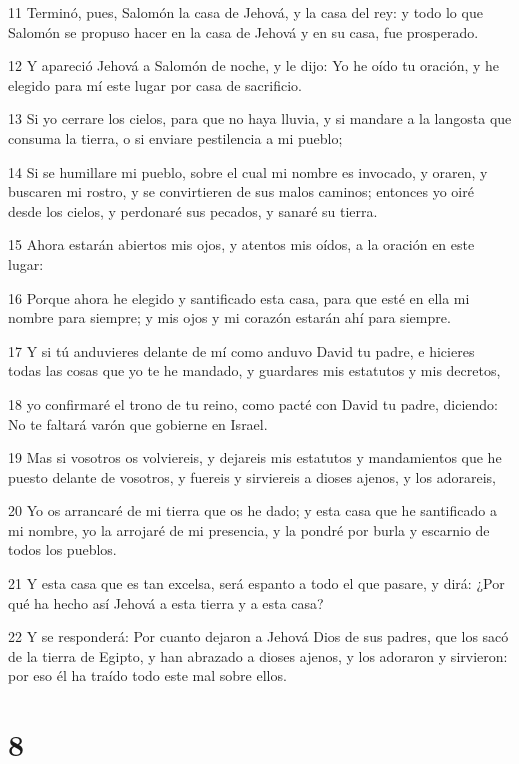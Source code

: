 \par 11 Terminó, pues, Salomón la casa de Jehová, y la casa del rey: y todo lo que Salomón se propuso hacer en la casa de Jehová y en su casa, fue prosperado.
\par 12 Y apareció Jehová a Salomón de noche, y le dijo: Yo he oído tu oración, y he elegido para mí este lugar por casa de sacrificio.
\par 13 Si yo cerrare los cielos, para que no haya lluvia, y si mandare a la langosta que consuma la tierra, o si enviare pestilencia a mi pueblo;
\par 14 Si se humillare mi pueblo, sobre el cual mi nombre es invocado, y oraren, y buscaren mi rostro, y se convirtieren de sus malos caminos; entonces yo oiré desde los cielos, y perdonaré sus pecados, y sanaré su tierra.
\par 15 Ahora estarán abiertos mis ojos, y atentos mis oídos, a la oración en este lugar:
\par 16 Porque ahora he elegido y santificado esta casa, para que esté en ella mi nombre para siempre; y mis ojos y mi corazón estarán ahí para siempre.
\par 17 Y si tú anduvieres delante de mí como anduvo David tu padre, e hicieres todas las cosas que yo te he mandado, y guardares mis estatutos y mis decretos,
\par 18 yo confirmaré el trono de tu reino, como pacté con David tu padre, diciendo: No te faltará varón que gobierne en Israel. 
\par 19 Mas si vosotros os volviereis, y dejareis mis estatutos y mandamientos que he puesto delante de vosotros, y fuereis y sirviereis a dioses ajenos, y los adorareis,
\par 20 Yo os arrancaré de mi tierra que os he dado; y esta casa que he santificado a mi nombre, yo la arrojaré de mi presencia, y la pondré por burla y escarnio de todos los pueblos.
\par 21 Y esta casa que es tan excelsa, será espanto a todo el que pasare, y dirá: ¿Por qué ha hecho así Jehová a esta tierra y a esta casa?
\par 22 Y se responderá: Por cuanto dejaron a Jehová Dios de sus padres, que los sacó de la tierra de Egipto, y han abrazado a dioses ajenos, y los adoraron y sirvieron: por eso él ha traído todo este mal sobre ellos.

\chapter{8}

